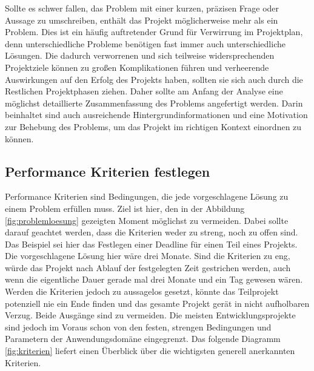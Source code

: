     Sollte es schwer fallen, das Problem mit einer kurzen, präzisen Frage oder Aussage zu umschreiben, 
    enthält das Projekt möglicherweise mehr als ein Problem. Dies ist ein häufig auftretender Grund für 
    Verwirrung im Projektplan, denn unterschiedliche Probleme benötigen fast immer auch unterschiedliche 
    Lösungen. Die dadurch verworrenen und sich teilweise widersprechenden Projektziele können zu großen 
    Komplikationen führen und verheerende Auswirkungen auf den Erfolg des Projekts haben, sollten sie 
    sich auch durch die Restlichen Projektphasen ziehen.
    Daher sollte am Anfang der Analyse eine möglichst detaillierte Zusammenfassung des Problems 
    angefertigt werden. Darin beinhaltet sind auch ausreichende Hintergrundinformationen und eine 
    Motivation zur Behebung des Problems, um das Projekt im richtigen Kontext einordnen zu können.

    \subsection{Performance Kriterien festlegen}

    Performance Kriterien sind Bedingungen, die jede vorgeschlagene Lösung zu einem Problem erfüllen muss.
    Ziel ist hier, den in der Abbildung \ref{fig:problemloesung} gezeigten Moment möglichst zu vermeiden. 
    Dabei sollte darauf geachtet werden, dass die Kriterien weder zu streng, noch zu offen sind. Das 
    Beispiel sei hier das Festlegen einer Deadline für einen Teil eines Projekts. Die vorgeschlagene 
    Lösung hier wäre drei Monate. Sind die Kriterien zu eng, würde das Projekt nach Ablauf der 
    festgelegten Zeit gestrichen werden, auch wenn die eigentliche Dauer gerade mal drei Monate und 
    ein Tag gewesen wären. Werden die Kriterien jedoch zu aussagelos gesetzt, könnte das Teilprojekt 
    potenziell nie ein Ende finden und das gesamte Projekt gerät in nicht aufholbaren Verzug. 
    Beide Ausgänge sind zu vermeiden. Die meisten Entwicklungsprojekte sind jedoch im Voraus schon von den 
    festen, strengen Bedingungen und Parametern der Anwendungsdomäne eingegrenzt. Das folgende Diagramm 
    \ref{fig:kriterien} liefert einen Überblick über die wichtigsten generell anerkannten Kriterien.


